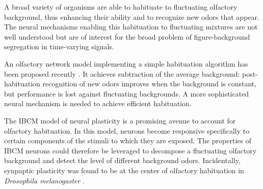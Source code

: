 
A broad variety of organisms are able to habituate to fluctuating olfactory background, thus enhancing their ability  and to recognize new odors that appear. The neural mechanisms enabling this habituation to fluctuating mixtures are not well understood but are of interest for the broad problem of figure-background segregation in time-varying signals. 

An olfactory network model implementing a simple habituation algorithm has been proposed recently \cite{shen_habituation_2020}. It achieves subtraction of the average background: post-habituation recognition of new odors improves when the background is constant, but performance is lost against fluctuating backgrounds. A more sophisticated neural mechanism is needed to achieve efficient habituation. %

The IBCM model of neural plasticity is a promising avenue to account for olfactory habituation. In this model, neurons become responsive specifically to certain components of the stimuli to which they are exposed. 
The properties of IBCM neurons could therefore be leveraged to decompose a fluctuating olfactory background and detect the level of different background odors. Incidentally, synpaptic plasticity was found to be at the center of olfactory habituation in \textit{Drosophila melanogaster} \cite{das_plasticity_2011}. 

